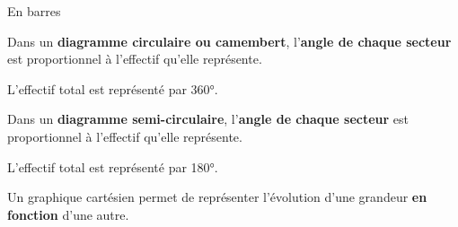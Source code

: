 \begin{changemargin}{0mm}{-15mm}
\begin{exemples*1}
\begin{center}
            \medskip
            En barres\\\smallskip
        \end{center}
    \end{exemples*1}
    \begin{minipage}{0.8\linewidth}
        \begin{definition}
            Dans un \textbf{diagramme circulaire ou camembert}, l'\textbf{angle de chaque secteur} est proportionnel à l'effectif qu'elle représente.
        
            L'effectif total est représenté par \ang{360}.   
        \end{definition}
    \end{minipage}
    \hspace*{-15mm}
    \begin{minipage}{0.2\linewidth}
        \begin{center}
        \end{center}
    \end{minipage}   

    \begin{minipage}{0.8\linewidth}
        \begin{definition}
        Dans un \textbf{diagramme semi-circulaire}, l'\textbf{angle de chaque secteur} est proportionnel à l'effectif qu'elle représente.
        \par
        L'effectif total est représenté par \ang{180}.
        \end{definition}
     \end{minipage}
     \hspace*{-15mm}
     \begin{minipage}{0.2\linewidth}
        \begin{center}
        \end{center}
     \end{minipage}
    \begin{definition}
        Un graphique cartésien permet de représenter l'évolution d'une grandeur \textbf{en fonction} d'une autre.
    \end{definition}
    \begin{exemple*1}


\end{exemple*1}
\end{changemargin}
